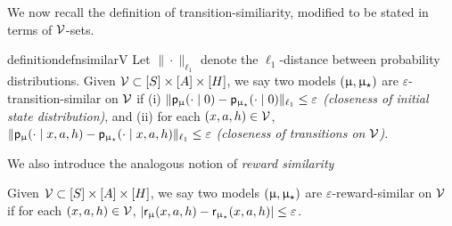 We now recall the definition of transition-similiarity, modified to be stated in terms of $\mathcal{V}$-sets.
\begin{restatable}{definition}{defnsimilarV} \label{defn:similarity_V} Let $\|\cdot\|_{\ell_1}$ denote the $\ell_1$-distance between probability distributions.  Given $\mathcal{V} \subset [S] \times [A] \times [H]$, we say two models $(\upmu,\upmu_{\star})$ are $\varepsilon$-transition-similar on $\mathcal{V}$ if (i) $\|\mathsf{p}_{\upmu}(\cdot \mid 0 ) - \mathsf{p}_{\upmu_{\star}}(\cdot \mid 0)\|_{\ell_1} \le \varepsilon $ \emph{(closeness of initial state distribution)}, and (ii) for each $(x,a,h) \in \mathcal{V}$, $\|\mathsf{p}_{\upmu}(\cdot \mid x,a,h) - \mathsf{p}_{\upmu_{\star}}(\cdot\mid x,a,h)\|_{\ell_1} \le \varepsilon$ \emph{(closeness of transitions on $\mathcal{V}$)}.
\end{restatable}

We also introduce the analogous notion of \emph{reward similarity}
\begin{definition}\label{defn:similarity_R}  Given $\mathcal{V} \subset [S] \times [A] \times [H]$, we say two models $(\upmu,\upmu_{\star})$ are $\varepsilon$-reward-similar on $\mathcal{V}$ if for each $(x,a,h) \in \mathcal{V}$, $|\mathsf{r}_{\upmu}(x,a,h) - \mathsf{r}_{\upmu_{\star}}( x,a,h)| \le \varepsilon$.
\end{definition}




